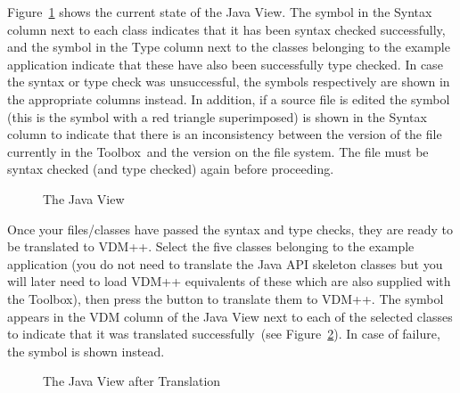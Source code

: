 \documentclass[\pformat,12pt]{article}
\newcommand{\Toolbox}{Toolbox}
\newcommand{\guicmd}[1]{{\sf #1}}
\begin{document}
Figure~\ref{fig:javaView} shows the current state of the \guicmd{Java
  View}. The symbol
in the \guicmd{Syntax} column next to each class indicates that it has
  been syntax checked successfully, and the symbol
  in the \guicmd{Type} column next to the classes belonging to the
  example application indicate that these have also been successfully
  type checked. In case the syntax or type check was unsuccessful, the
  symbols 
  respectively
are shown in the appropriate columns instead. In addition, if a source
  file is edited the symbol
  (this is the symbol 
with a red triangle superimposed)
is shown in the \guicmd{Syntax} column to indicate that there is an
  inconsistency between the version of the file 
currently in the \Toolbox\ and the version on the file system. The
file must be syntax checked (and type checked) again before proceeding.

\begin{figure}[tbh]
\begin{center}
\caption{The Java View}\label{fig:javaView}
\end{center}
\end{figure}

Once your files/classes have passed the syntax and type checks, they
are ready to be translated to VDM++. Select the five classes belonging
to the example application (you do not need to translate the Java API
skeleton classes but you will later need to load VDM++ equivalents of
these which are also supplied with the Toolbox), then press the
button to translate them to VDM++. The symbol 
appears in the \guicmd{VDM} column of the \guicmd{Java View} next to
each of the selected classes to indicate that it was translated
successfully~(see Figure~\ref{fig:translationDone}). In case of failure,
the symbol  
is shown instead.

\begin{figure}[tbh]
\begin{center}
\caption{The Java View after Translation}\label{fig:translationDone}
\end{center}
\end{figure}
\end{document}
